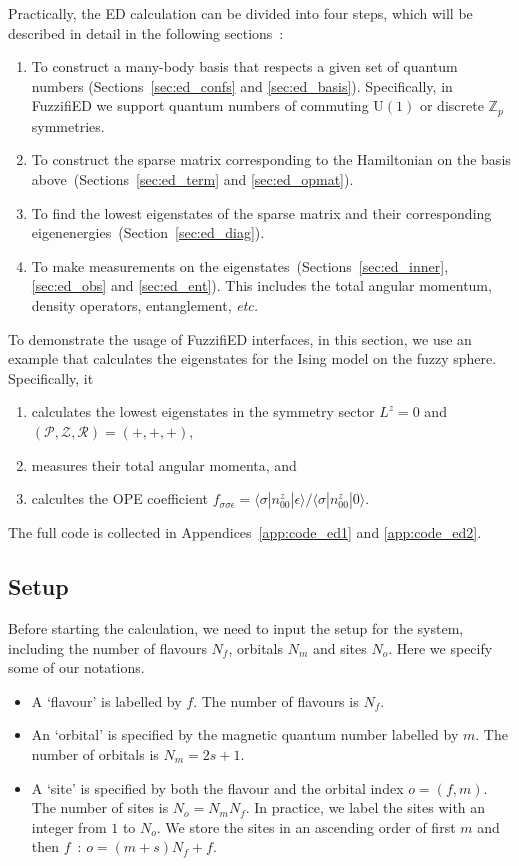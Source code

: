 \documentclass{timesjhep}
\begin{document}
Practically, the ED calculation can be divided into four steps, which will be described in detail in the following sections~:
\begin{enumerate}
    \item To construct a many-body basis that respects a given set of quantum numbers (Sections~\ref{sec:ed_confs} and \ref{sec:ed_basis}). Specifically, in FuzzifiED we support quantum numbers of commuting $\mathrm{U}(1)$ or discrete $\mathbb{Z}_p$ symmetries.
    \item To construct the sparse matrix corresponding to the Hamiltonian on the basis above~(Sections~\ref{sec:ed_term} and \ref{sec:ed_opmat}).
    \item To find the lowest eigenstates of the sparse matrix and their corresponding eigenenergies~(Section~\ref{sec:ed_diag}).
    \item To make measurements on the eigenstates~(Sections~\ref{sec:ed_inner}, \ref{sec:ed_obs} and \ref{sec:ed_ent}). This includes the total angular momentum, density operators, entanglement, \textit{etc.}
\end{enumerate}

To demonstrate the usage of FuzzifiED interfaces, in this section, we use an example that calculates the eigenstates for the Ising model on the fuzzy sphere. Specifically, it
\begin{enumerate}
    \item calculates the lowest eigenstates in the symmetry sector $L^z=0$ and $(\mathcal{P},\mathcal{Z},\mathcal{R})=(+,+,+)$,
    \item measures their total angular momenta, and
    \item calcultes the OPE coefficient $f_{\sigma\sigma\epsilon}=\langle \sigma|n^z_{00}|\epsilon\rangle/\langle \sigma|n^z_{00}|0\rangle$.
\end{enumerate}
The full code is collected in Appendices~\ref{app:code_ed1} and \ref{app:code_ed2}.

\subsection{Setup}
\label{sec:ed_setup}

Before starting the calculation, we need to input the setup for the system, including the number of flavours $N_f$, orbitals $N_m$ and sites $N_o$. Here we specify some of our notations.
\begin{itemize}
    \item A `flavour' is labelled by $f$. The number of flavours is $N_f$.
    \item An `orbital' is specified by the magnetic quantum number labelled by $m$. The number of orbitals is $N_m=2s+1$.
    \item A `site' is specified by both the flavour and the orbital index $o=(f,m)$. The number of sites is $N_o=N_mN_f$. In practice, we label the sites with an integer from $1$ to $N_o$. We store the sites in an ascending order of first $m$ and then $f$~: $o=(m+s)N_f+f$.
\end{itemize}
\end{document}
